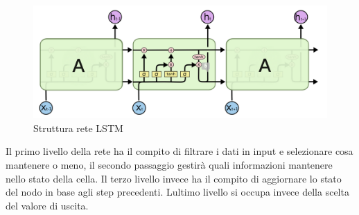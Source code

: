 \documentclass[%
    corpo=12pt,
    twoside,
    oldstyle,
    autoretitolo,
    greek,
    evenboxes,
]{toptesi}
\begin{document}
\begin{figure}[!ht]
  \includegraphics[width=\linewidth]{figure/lstm.png}
  \caption{Struttura rete LSTM \cite{lstm_image}}
  \label{fig:lstm}
\end{figure}

Il primo livello della rete ha il compito di filtrare i dati in input e selezionare cosa mantenere o meno, il secondo passaggio gestirà quali informazioni mantenere nello stato della cella. Il terzo livello invece ha il compito di aggiornare lo stato del nodo in base agli step precedenti. Lultimo livello si occupa invece della scelta del valore di uscita.
\end{document}
